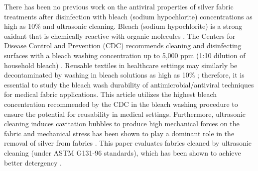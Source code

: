 \documentclass[10pt,letterpaper]{article}
\begin{document}


There has been no previous work on the 
antiviral properties of silver fabric treatments after disinfection with bleach (sodium hypochlorite) concentrations as high as 10\% and ultrasonic cleaning.  
Bleach (sodium hypochlorite) is a strong oxidant that is chemically reactive with organic molecules \cite{eleni:2013,farr:2003}. %
The Centers for Disease Control and Prevention (CDC) recommends cleaning and disinfecting surfaces with a bleach washing concentration up to 5,000 ppm (1:10 dilution of household bleach) \cite{cdc:1987}.
Reusable textiles in healthcare settings may similarly be decontaminated by washing in bleach solutions as high as 10\% \cite{Cintas,cdc:1987}; therefore, it is essential to study the bleach wash durability of antimicrobial/antiviral techniques for medical fabric applications. 
This article utilizes the highest bleach concentration recommended by the CDC in the bleach washing procedure to ensure the potential for reusability in medical settings. 
Furthermore, ultrasonic cleaning induces cavitation bubbles to
produce high mechanical forces on the fabric \cite{Fuchs:15} and
mechanical stress has %
been shown to play a dominant role in the removal of silver from fabrics
\cite{geranio:2009}. This paper evaluates fabrics cleaned by ultrasonic cleaning (under 
ASTM G131-96 standards), 
which has been shown to 
achieve better detergency
\cite{Gallego-juarez:10}.
\end{document}
